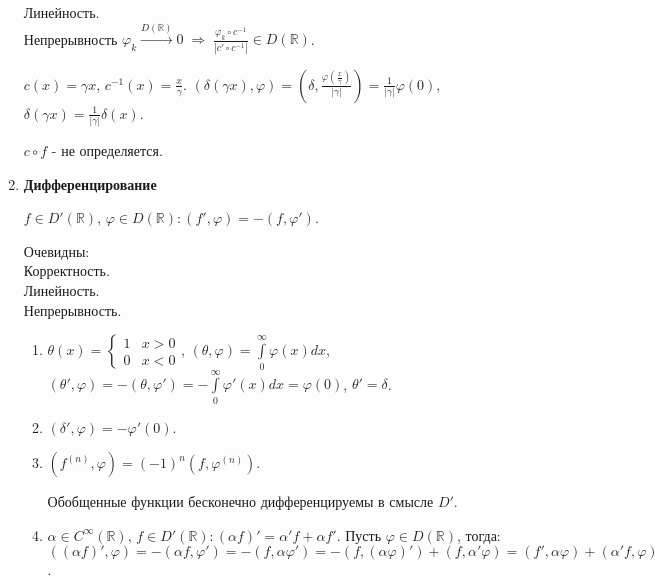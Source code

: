 \begin{enumerate}
    Линейность.\\
    Непрерывность $\varphi_{k} \xrightarrow{D (\mathbb{R})} 0 \; \Rightarrow \; \frac{\varphi_{k} \circ c^{- 1}}{\left|c' \circ c^{- 1}\right|} \in D (\mathbb{R})$.\\
    \begin{example} $c(x) = \gamma x$, $c^{- 1} (x) = \frac{x}{\gamma}$. $(\delta(\gamma x), \varphi) = \left(\delta, \frac{\varphi \left(\frac{x}{\gamma}\right)}{|\gamma|}\right) = \frac{1}{|\gamma|} \varphi (0)$, $\delta (\gamma x) = \frac{1}{|\gamma|} \delta (x)$.
    \end{example}
    \begin{warning}
      $c \circ f$ - не определяется.
    \end{warning}
  \item \textbf{Дифференцирование}\\
    \begin{definition}
      $f \in D' (\mathbb{R}) \text{, } \varphi \in D (\mathbb{R}) \colon (f', \varphi) = - (f, \varphi')$.
    \end{definition}
        Очевидны:\\
      Корректность.\\
    Линейность.\\
    Непрерывность.\\
    \begin{example}
      \begin{enumerate}
        \item $\theta (x) = \begin{cases}1 & x > 0\\ 0 & x < 0\end{cases}$, $(\theta, \varphi) = \int\limits_{0}^{\infty} \varphi (x) d x$, $(\theta', \varphi) = - (\theta, \varphi') = - \int\limits_{0}^{\infty} \varphi' (x) d x = \varphi (0)$, $\theta' = \delta$.\\
        \item $(\delta', \varphi) = - \varphi' (0)$.\\
        \item $(f^{(n)}, \varphi) = (- 1)^{n} (f, \varphi^{(n)})$.\\
          \begin{warning}
            Обобщенные функции бесконечно дифференцируемы в смысле $D'$.
          \end{warning}
        \item $\alpha \in C^{\infty} (\mathbb{R}) \text{, } f \in D' (\mathbb{R}) \colon (\alpha f)' = \alpha' f + \alpha f'$. Пусть $\varphi \in D (\mathbb{R})$, тогда: $((\alpha f)', \varphi) = - (\alpha f, \varphi') = - (f, \alpha \varphi') = - (f, (\alpha \varphi)') + (f, \alpha' \varphi) = (f', \alpha \varphi) + (\alpha' f, \varphi)$.

\end{enumerate}
\end{example}
\end{enumerate}
